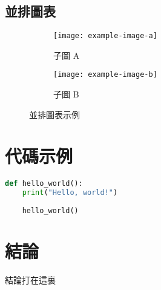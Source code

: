 \documentclass{article}
\begin{document}
\subsection{並排圖表}
\begin{figure}[h]
	\centering
	\begin{subfigure}{0.45\textwidth}
		\centering
		\texttt{[image: example-image-a]} %
		\caption{子圖 A}
	\end{subfigure}
	\hfill
	\begin{subfigure}{0.45\textwidth}
		\centering
		\texttt{[image: example-image-b]} %
		\caption{子圖 B}
	\end{subfigure}
	\caption{並排圖表示例}
	\label{fig:sidebyside}
\end{figure}
	
\section{代碼示例}
\begin{lstlisting}[language=Python, caption=Python 代碼示例]
	def hello_world():
	print("Hello, world!")
	
	hello_world()
\end{lstlisting}
	
\section{結論}
結論打在這裏
	
\end{document}
